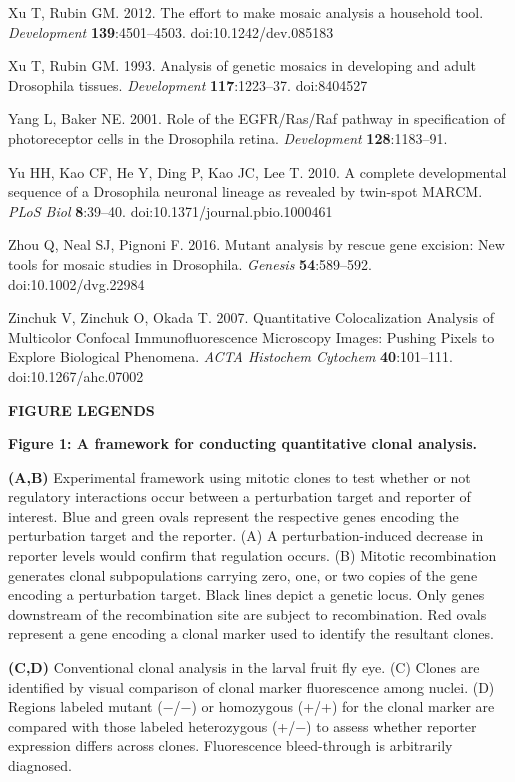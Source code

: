 Xu T, Rubin GM. 2012. The effort to make mosaic analysis a household tool. \emph{Development} \textbf{139}:4501--4503. doi:10.1242/dev.085183

Xu T, Rubin GM. 1993. Analysis of genetic mosaics in developing and adult Drosophila tissues. \emph{Development} \textbf{117}:1223--37. doi:8404527

Yang L, Baker NE. 2001. Role of the EGFR/Ras/Raf pathway in specification of photoreceptor cells in the Drosophila retina. \emph{Development} \textbf{128}:1183--91.

Yu HH, Kao CF, He Y, Ding P, Kao JC, Lee T. 2010. A complete developmental sequence of a Drosophila neuronal lineage as revealed by twin-spot MARCM. \emph{PLoS Biol} \textbf{8}:39--40. doi:10.1371/journal.pbio.1000461

Zhou Q, Neal SJ, Pignoni F. 2016. Mutant analysis by rescue gene excision: New tools for mosaic studies in Drosophila. \emph{Genesis} \textbf{54}:589--592. doi:10.1002/dvg.22984

Zinchuk V, Zinchuk O, Okada T. 2007. Quantitative Colocalization Analysis of Multicolor Confocal Immunofluorescence Microscopy Images: Pushing Pixels to Explore Biological Phenomena. \emph{ACTA Histochem Cytochem} \textbf{40}:101--111. doi:10.1267/ahc.07002

\textbf{FIGURE LEGENDS}

\textbf{Figure 1: A framework for conducting quantitative clonal analysis.}

\textbf{(A,B)} Experimental framework using mitotic clones to test whether or not regulatory interactions occur between a perturbation target and reporter of interest. Blue and green ovals represent the respective genes encoding the perturbation target and the reporter. (A) A perturbation-induced decrease in reporter levels would confirm that regulation occurs. (B) Mitotic recombination generates clonal subpopulations carrying zero, one, or two copies of the gene encoding a perturbation target. Black lines depict a genetic locus. Only genes downstream of the recombination site are subject to recombination. Red ovals represent a gene encoding a clonal marker used to identify the resultant clones.

\textbf{(C,D)} Conventional clonal analysis in the larval fruit fly eye. (C) Clones are identified by visual comparison of clonal marker fluorescence among nuclei. (D) Regions labeled mutant (−/−) or homozygous (+/+) for the clonal marker are compared with those labeled heterozygous (+/−) to assess whether reporter expression differs across clones. Fluorescence bleed-through is arbitrarily diagnosed.

